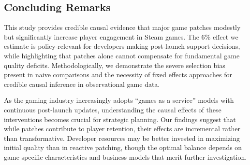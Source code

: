 \documentclass[12pt,a4paper]{article}
\begin{document}
\subsection{Concluding Remarks}

This study provides credible causal evidence that major game patches modestly but significantly increase player engagement in Steam games. The 6\% effect we estimate is policy-relevant for developers making post-launch support decisions, while highlighting that patches alone cannot compensate for fundamental game quality deficits. Methodologically, we demonstrate the severe selection bias present in naive comparisons and the necessity of fixed effects approaches for credible causal inference in observational game data.

As the gaming industry increasingly adopts ``games as a service'' models with continuous post-launch updates, understanding the causal effects of these interventions becomes crucial for strategic planning. Our findings suggest that while patches contribute to player retention, their effects are incremental rather than transformative. Developer resources may be better invested in maximizing initial quality than in reactive patching, though the optimal balance depends on game-specific characteristics and business models that merit further investigation.
\end{document}
